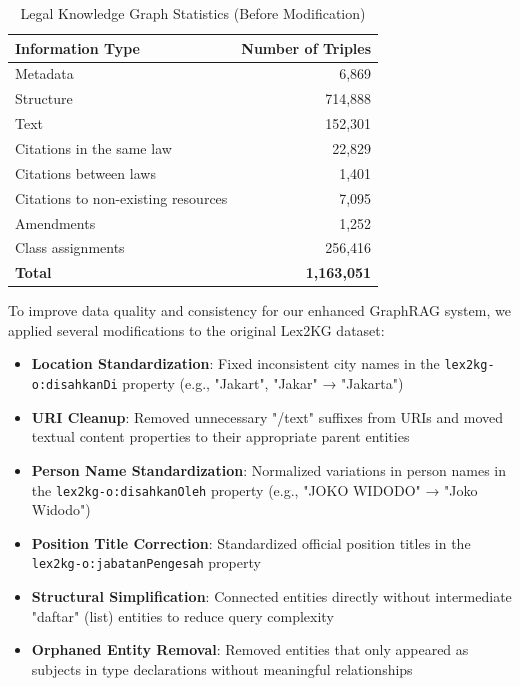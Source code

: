 \begin{table}[htbp]
\centering
\renewcommand{\arraystretch}{1.15}
\setlength{\tabcolsep}{12pt}
\begin{tabular}{| l | r |}
\hline
\textbf{Information Type} & \textbf{Number of Triples} \\
\hline
Metadata & 6,869 \\
Structure & 714,888 \\
Text & 152,301 \\
Citations in the same law & 22,829 \\
Citations between laws & 1,401 \\
Citations to non-existing resources & 7,095 \\
Amendments & 1,252 \\
Class assignments & 256,416 \\
\hline
\textbf{Total} & \textbf{1,163,051} \\
\hline
\end{tabular}
\caption{Legal Knowledge Graph Statistics (Before Modification)}
\label{table-legal-statistics}
\end{table}

To improve data quality and consistency for our enhanced GraphRAG system, we applied several modifications to the original Lex2KG dataset:

\begin{itemize}
    \item \textbf{Location Standardization}: Fixed inconsistent city names in the \texttt{lex2kg-o:disahkanDi} property (e.g., "Jakart", "Jakar" → "Jakarta")
    \item \textbf{URI Cleanup}: Removed unnecessary "/text" suffixes from URIs and moved textual content properties to their appropriate parent entities
    \item \textbf{Person Name Standardization}: Normalized variations in person names in the \texttt{lex2kg-o:disahkanOleh} property (e.g., "JOKO WIDODO" → "Joko Widodo")
    \item \textbf{Position Title Correction}: Standardized official position titles in the \texttt{lex2kg-o:jabatanPengesah} property
    \item \textbf{Structural Simplification}: Connected entities directly without intermediate "daftar" (list) entities to reduce query complexity
    \item \textbf{Orphaned Entity Removal}: Removed entities that only appeared as subjects in type declarations without meaningful relationships
\end{itemize}

